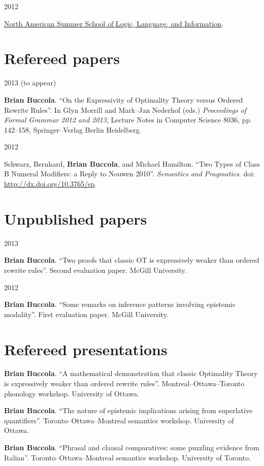 \documentclass[11pt,letterpaper]{article}
\newcommand{\name}{Brian Buccola}
\newcommand{\cvitem}[2]{%
  \begin{minipage}[t]{0.24\textwidth}
    #1 %
  \end{minipage}
  \hfill
  \begin{minipage}[t]{0.74\textwidth}
    #2 %
  \end{minipage}
}
\begin{document}
\cvitem{2012 \shortmonthname[6]}{\href{http://nasslli2012.com/about}{North
American Summer School of Logic, Language, and Information}.}



\section*{Refereed papers}

\cvitem{2013 {\footnotesize (to appear)}}{\textbf{\name}. ``On the Expressivity
of Optimality Theory versus Ordered Rewrite Rules''. In Glyn Morrill and
Mark--Jan Nederhof (eds.) \textit{Proceedings of Formal Grammar 2012 and
2013}, Lecture Notes in Computer Science 8036, pp. 142--158, Springer--Verlag
Berlin Heidelberg.}

\cvitem{2012}{Schwarz, Bernhard, \textbf{\name}, and Michael Hamilton. ``Two
Types of Class B Numeral Modifiers: a Reply to Nouwen 2010''. \textit{Semantics
and Pragmatics}. doi: \url{http://dx.doi.org/10.3765/sp}.}



\section*{Unpublished papers}

\cvitem{2013}{\textbf{\name}. ``Two proofs that classic OT is expressively
weaker than ordered rewrite rules''. Second evaluation paper. McGill
University.}

\cvitem{2012}{\textbf{\name}. ``Some remarks on inference patterns involving
epistemic modality''. First evaluation paper. McGill University.}



\section*{Refereed presentations}

\cvitem{}{\textbf{\name}. ``A mathematical
demonstration that classic Optimality Theory is expressively weaker than
ordered rewrite rules''. Montreal--Ottawa--Toronto phonology workshop.
University of Ottawa.}

\cvitem{}{\textbf{\name}. ``The nature of epistemic
implications arising from superlative quantifiers''. Toronto--Ottawa--Montreal
semantics workshop. University of Ottawa.}

\cvitem{}{\textbf{\name}. ``Phrasal and clausal
comparatives: some puzzling evidence from Italian''. Toronto--Ottawa--Montreal
semantics workshop.  University of Toronto.}
\end{document}
